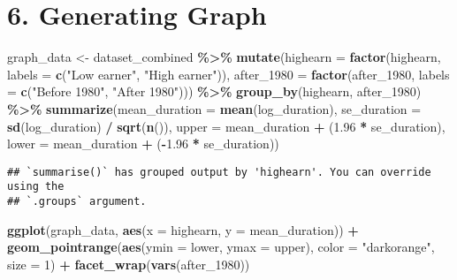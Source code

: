 \documentclass[
]{article}
\newenvironment{Shaded}{\begin{snugshade}}{\end{snugshade}}
\newcommand{\AttributeTok}[1]{\textcolor[rgb]{0.13,0.29,0.53}{#1}}
\newcommand{\DecValTok}[1]{\textcolor[rgb]{0.00,0.00,0.81}{#1}}
\newcommand{\FloatTok}[1]{\textcolor[rgb]{0.00,0.00,0.81}{#1}}
\newcommand{\FunctionTok}[1]{\textcolor[rgb]{0.13,0.29,0.53}{\textbf{#1}}}
\newcommand{\NormalTok}[1]{#1}
\newcommand{\OtherTok}[1]{\textcolor[rgb]{0.56,0.35,0.01}{#1}}
\newcommand{\SpecialCharTok}[1]{\textcolor[rgb]{0.81,0.36,0.00}{\textbf{#1}}}
\newcommand{\StringTok}[1]{\textcolor[rgb]{0.31,0.60,0.02}{#1}}
\begin{document}
\section{6. Generating Graph}\label{generating-graph}

\begin{Shaded}
\begin{Highlighting}[]
\NormalTok{graph\_data }\OtherTok{\textless{}{-}}\NormalTok{ dataset\_combined }\SpecialCharTok{\%\textgreater{}\%} 
   \FunctionTok{mutate}\NormalTok{(}\AttributeTok{highearn =} \FunctionTok{factor}\NormalTok{(highearn, }\AttributeTok{labels =} \FunctionTok{c}\NormalTok{(}\StringTok{"Low earner"}\NormalTok{, }\StringTok{"High earner"}\NormalTok{)),}
         \AttributeTok{after\_1980 =} \FunctionTok{factor}\NormalTok{(after\_1980, }\AttributeTok{labels =} \FunctionTok{c}\NormalTok{(}\StringTok{"Before 1980"}\NormalTok{, }\StringTok{"After 1980"}\NormalTok{))) }\SpecialCharTok{\%\textgreater{}\%} 
  \FunctionTok{group\_by}\NormalTok{(highearn, after\_1980) }\SpecialCharTok{\%\textgreater{}\%} 
  \FunctionTok{summarize}\NormalTok{(}\AttributeTok{mean\_duration =} \FunctionTok{mean}\NormalTok{(log\_duration),}
            \AttributeTok{se\_duration =} \FunctionTok{sd}\NormalTok{(log\_duration) }\SpecialCharTok{/} \FunctionTok{sqrt}\NormalTok{(}\FunctionTok{n}\NormalTok{()),}
            \AttributeTok{upper =}\NormalTok{ mean\_duration }\SpecialCharTok{+}\NormalTok{ (}\FloatTok{1.96} \SpecialCharTok{*}\NormalTok{ se\_duration),}
            \AttributeTok{lower =}\NormalTok{ mean\_duration }\SpecialCharTok{+}\NormalTok{ (}\SpecialCharTok{{-}}\FloatTok{1.96} \SpecialCharTok{*}\NormalTok{ se\_duration)) }
\end{Highlighting}
\end{Shaded}

\begin{verbatim}
## `summarise()` has grouped output by 'highearn'. You can override using the
## `.groups` argument.
\end{verbatim}

\begin{Shaded}
\begin{Highlighting}[]
\FunctionTok{ggplot}\NormalTok{(graph\_data, }\FunctionTok{aes}\NormalTok{(}\AttributeTok{x =}\NormalTok{ highearn, }\AttributeTok{y =}\NormalTok{ mean\_duration)) }\SpecialCharTok{+}
  \FunctionTok{geom\_pointrange}\NormalTok{(}\FunctionTok{aes}\NormalTok{(}\AttributeTok{ymin =}\NormalTok{ lower, }\AttributeTok{ymax =}\NormalTok{ upper), }
                  \AttributeTok{color =} \StringTok{"darkorange"}\NormalTok{, }\AttributeTok{size =} \DecValTok{1}\NormalTok{) }\SpecialCharTok{+}
  \FunctionTok{facet\_wrap}\NormalTok{(}\FunctionTok{vars}\NormalTok{(after\_1980))}
\end{Highlighting}
\end{Shaded}
\end{document}

